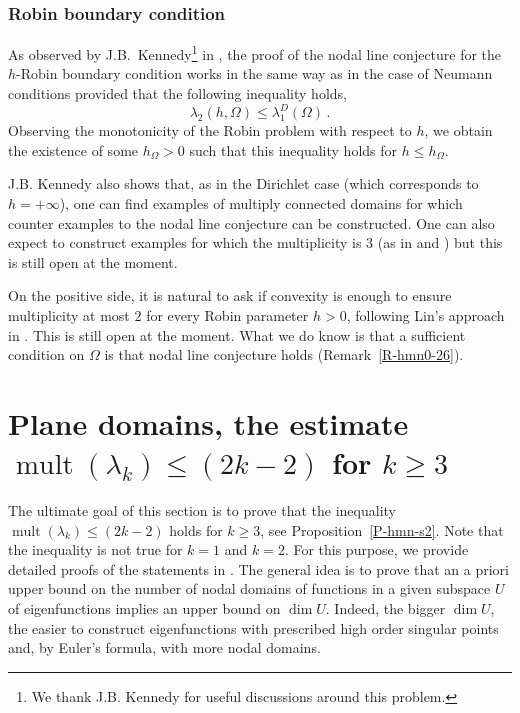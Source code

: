 \documentclass[12pt,a4paper]{amsart}
\theoremstyle{plain} %
\theoremstyle{definition}
\numberwithin{equation}{section}
\numberwithin{figure}{section}
\numberwithin{table}{section}
\DeclareMathOperator{\mult}{mult}
\begin{document}
{\subsubsection{Robin boundary condition}\label{SSS-hmn-0CR}
As observed by J.B.~Kennedy\footnote{We thank J.B. Kennedy for
useful discussions around this problem.} in \cite{Ken2011}, the proof of the nodal line conjecture for the $h$-Robin boundary condition works
in the same way as in the case of Neumann conditions provided that the following
inequality holds,
%
$$
\lambda_2 (h,\Omega) \leq  \lambda_1^D(\Omega)\,.
$$
%
Observing the monotonicity of the Robin problem with respect to $h$,
we obtain the existence of some $h_\Omega >0$ such that this inequality
holds for $h \leq  h_\Omega$.\smallskip

J.B. Kennedy also shows that, as in the Dirichlet case (which corresponds to $h=+\infty$), one can find examples of multiply connected domains for which counter examples to the nodal line conjecture can be constructed. One can also expect to construct examples for which the multiplicity is $3$
(as in  \cite{HoHN1998} and \cite{HeHJ2020})  but this is still open
at the moment.\smallskip

On the positive side, it is natural to ask if convexity is enough to ensure multiplicity at most $2$ for every Robin parameter $h>0$, following Lin's approach in \cite{Lin1987}. This is still open at the moment. What we do know is that a sufficient  condition on $\Omega$  is that nodal line conjecture holds (Remark~\ref{R-hmn0-26}).


\section{Plane domains, the estimate $\mult(\lambda_k) \le (2k-2)$ for $k\geq 3$}\label{S-hmn2}

The ultimate goal of this section is to prove that  the inequality $\mult(\lambda_k) \le (2k-2)$ holds for $k \ge 3$, see Proposition~\ref{P-hmn-s2}. Note that the inequality is not true for $k=1$ and $k=2$. For this purpose, we provide detailed proofs of the statements in \cite[Section~2]{HoMN1999}. The general idea is to prove that an a priori upper bound on the number of nodal domains of functions in a given subspace $U$ of eigenfunctions implies an upper bound on $\dim U$. Indeed, the bigger $\dim U$, the easier to construct eigenfunctions with prescribed high order singular points  and, by Euler's formula, with more nodal domains.\smallskip


}
\end{document}
